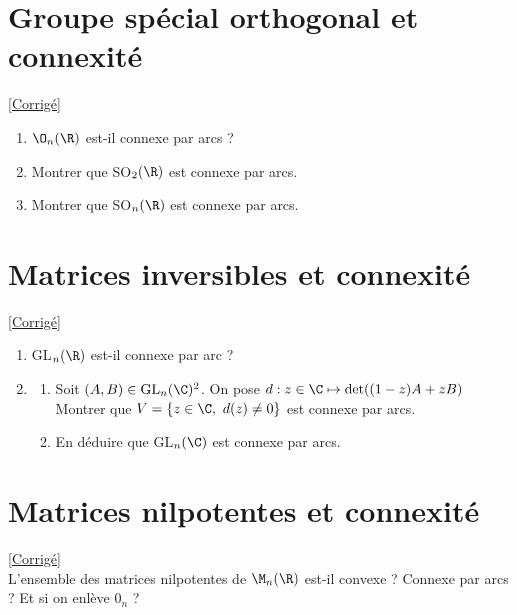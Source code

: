 \documentclass{book}
\begin{document}
\section{Groupe spécial orthogonal et connexité}
\label{Groupe spécial orthogonal et connexité}
\textcolor{blue}{\hyperref[sec:groupe-special-orthogonal-et-connexite]{[Corrigé]}}\\
\begin{enumerate}[leftmargin=*]
	\item $\O_n(\R)$ est-il connexe par arcs ?
	\item Montrer que SO$_2(\R)$ est connexe par arcs.
	\item Montrer que SO$_n(\R)$ est connexe par arcs.
\end{enumerate}

\section{Matrices inversibles et connexité}
\label{Matrices inversibles et connexité}
\textcolor{blue}{\hyperref[sec:matrices-inversibles-et-connexite]{[Corrigé]}}\\
\begin{enumerate}[leftmargin=*]
	\item GL$_n(\R)$ est-il connexe par arc ?
	\item \begin{enumerate}[label=\alph*.]
		\item Soit $(A,B)\in \text{GL}_n(\C)^2$. On pose $d:z\in \C \mapsto \operatorname{det}((1-z)A+zB)$\\
		Montrer que $V=\{z\in \C,\ d(z)\ne 0\}$ est connexe par arcs.
		\item En déduire que GL$_n(\C)$ est connexe par arcs.
	\end{enumerate}
\end{enumerate}

\section{Matrices nilpotentes et connexité}
\label{Matrices nilpotentes et connexité}
\textcolor{blue}{\hyperref[sec:matrices-nilpotentes-et-connexite]{[Corrigé]}}\\
L'ensemble des matrices nilpotentes de $\M_n(\R)$ est-il convexe ? Connexe par arcs ? Et si on enlève $0_n$ ?
\end{document}
